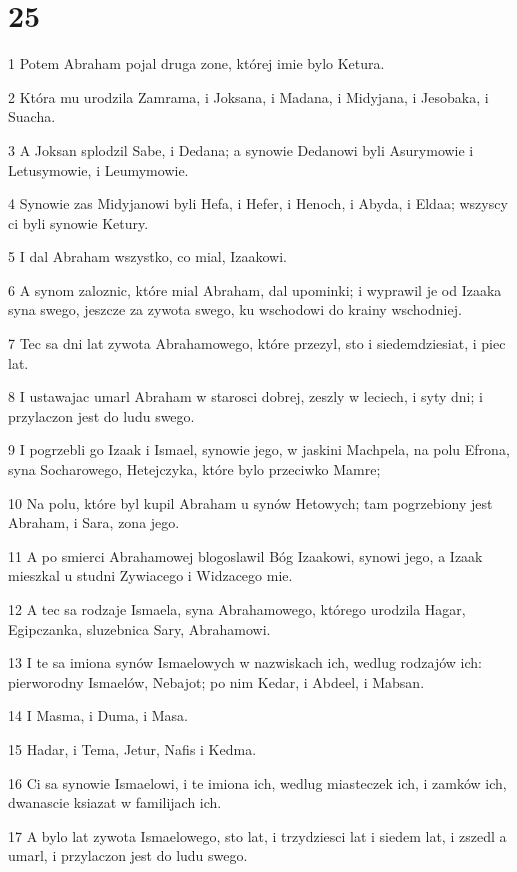 \chapter{25}

\par 1 Potem Abraham pojal druga zone, której imie bylo Ketura.
\par 2 Która mu urodzila Zamrama, i Joksana, i Madana, i Midyjana, i Jesobaka, i Suacha.
\par 3 A Joksan splodzil Sabe, i Dedana; a synowie Dedanowi byli Asurymowie i Letusymowie, i Leumymowie.
\par 4 Synowie zas Midyjanowi byli Hefa, i Hefer, i Henoch, i Abyda, i Eldaa; wszyscy ci byli synowie Ketury.
\par 5 I dal Abraham wszystko, co mial, Izaakowi.
\par 6 A synom zaloznic, które mial Abraham, dal upominki; i wyprawil je od Izaaka syna swego, jeszcze za zywota swego, ku wschodowi do krainy wschodniej.
\par 7 Tec sa dni lat zywota Abrahamowego, które przezyl, sto i siedemdziesiat, i piec lat.
\par 8 I ustawajac umarl Abraham w starosci dobrej, zeszly w leciech, i syty dni; i przylaczon jest do ludu swego.
\par 9 I pogrzebli go Izaak i Ismael, synowie jego, w jaskini Machpela, na polu Efrona, syna Socharowego, Hetejczyka, które bylo przeciwko Mamre;
\par 10 Na polu, które byl kupil Abraham u synów Hetowych; tam pogrzebiony jest Abraham, i Sara, zona jego.
\par 11 A po smierci Abrahamowej blogoslawil Bóg Izaakowi, synowi jego, a Izaak mieszkal u studni Zywiacego i Widzacego mie.
\par 12 A tec sa rodzaje Ismaela, syna Abrahamowego, którego urodzila Hagar, Egipczanka, sluzebnica Sary, Abrahamowi.
\par 13 I te sa imiona synów Ismaelowych w nazwiskach ich, wedlug rodzajów ich: pierworodny Ismaelów, Nebajot; po nim Kedar, i Abdeel, i Mabsan.
\par 14 I Masma, i Duma, i Masa.
\par 15 Hadar, i Tema, Jetur, Nafis i Kedma.
\par 16 Ci sa synowie Ismaelowi, i te imiona ich, wedlug miasteczek ich, i zamków ich, dwanascie ksiazat w familijach ich.
\par 17 A bylo lat zywota Ismaelowego, sto lat, i trzydziesci lat i siedem lat, i zszedl a umarl, i przylaczon jest do ludu swego.
